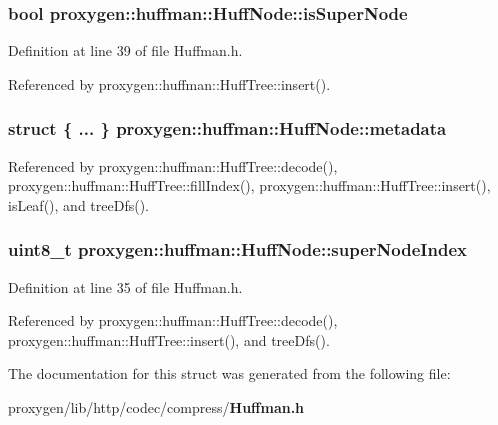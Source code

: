 \subsubsection[{is\+Super\+Node}]{\setlength{\rightskip}{0pt plus 5cm}bool proxygen\+::huffman\+::\+Huff\+Node\+::is\+Super\+Node}\label{structproxygen_1_1huffman_1_1HuffNode_aea8c87044ec6db978b1f7a0a452437a4}


Definition at line 39 of file Huffman.\+h.



Referenced by proxygen\+::huffman\+::\+Huff\+Tree\+::insert().

\subsubsection[{metadata}]{\setlength{\rightskip}{0pt plus 5cm}struct \{ ... \}   proxygen\+::huffman\+::\+Huff\+Node\+::metadata}\label{structproxygen_1_1huffman_1_1HuffNode_af1cd0b597191b847d98e6099509c7b85}


Referenced by proxygen\+::huffman\+::\+Huff\+Tree\+::decode(), proxygen\+::huffman\+::\+Huff\+Tree\+::fill\+Index(), proxygen\+::huffman\+::\+Huff\+Tree\+::insert(), is\+Leaf(), and tree\+Dfs().

\subsubsection[{super\+Node\+Index}]{\setlength{\rightskip}{0pt plus 5cm}uint8\+\_\+t proxygen\+::huffman\+::\+Huff\+Node\+::super\+Node\+Index}\label{structproxygen_1_1huffman_1_1HuffNode_a31c78ca49e0aa6050be5486d897b1582}


Definition at line 35 of file Huffman.\+h.



Referenced by proxygen\+::huffman\+::\+Huff\+Tree\+::decode(), proxygen\+::huffman\+::\+Huff\+Tree\+::insert(), and tree\+Dfs().



The documentation for this struct was generated from the following file\+:\begin{DoxyCompactItemize}
\item 
proxygen/lib/http/codec/compress/{\bf Huffman.\+h}\end{DoxyCompactItemize}
